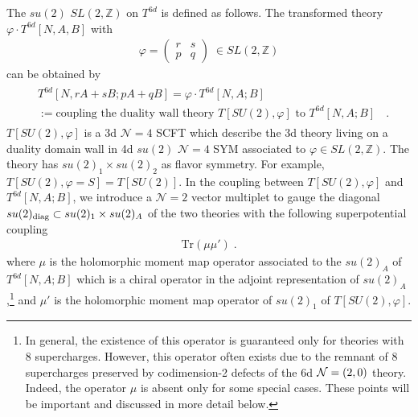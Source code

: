 \documentclass[a4paper,11pt]{article}
\def\cN{\mathcal{N}}
\def\CN{{\cal N}}
\begin{document}
The $su(2)$ $SL(2,\mathbb{Z})$ on $T^{6d}$ is defined as follows. The transformed theory $\varphi \cdot T^{6d}[N,A,B]$ with 
%
\begin{align}
\varphi =  \left(\begin{array}{cc}r & s \\ p & q\end{array}\right)\; \in SL(2,\mathbb{Z})
\end{align}
%
can be obtained by 
%
\begin{align}
\begin{split}
&T^{6d}[N,rA+sB;pA+qB] =  \varphi \cdot T^{6d}[N,A;B]
\\
&:=  \textrm{coupling the duality wall theory $T[SU(2),\varphi]$ to $T^{6d}[N,A;B]$ }\;.
\end{split}
\end{align}
%
$T[SU(2),\varphi]$ is a 3d $\cN=4$ SCFT which describe the 3d theory  living on a duality domain wall  in 4d $su(2)$ $\cN=4$ SYM associated to  $\varphi \in SL(2,\mathbb{Z})$. The theory has $su(2)_1 \times su(2)_2$ as flavor symmetry. For example, $T[SU(2), \varphi=S] = T[SU(2)]$. In the coupling between $T[SU(2),\varphi]$ and $T^{6d}[N,A;B]$, we introduce a $\cN=2$ vector multiplet to gauge the diagonal $su(2)_{\rm diag}\subset su(2)_{1} \times su(2)_A$ of the two theories with the following superpotential coupling
%
\begin{align}
\textrm{Tr}(\mu \mu')\;. \label{Superpotential coupling between T[SU(2)] and T[N]}
\end{align}
%
where $\mu$ is the holomorphic moment map operator associated to the $su(2)_A$ of $T^{6d}[N,A;B]$
which is a chiral operator in the adjoint representation of $su(2)_A$,\footnote{In general, the existence of this operator is guaranteed only for theories with 8
supercharges. However, this operator often exists due to the remnant of 8 supercharges preserved by codimension-2 defects of the 6d $\CN=(2,0)$ theory.
Indeed, the operator $\mu$ is absent only for some special cases. These points will be important and discussed in more detail below.}
and $\mu'$ is the holomorphic moment map operator of $su(2)_{1}$ of $T[SU(2),\varphi]$.
\end{document}
